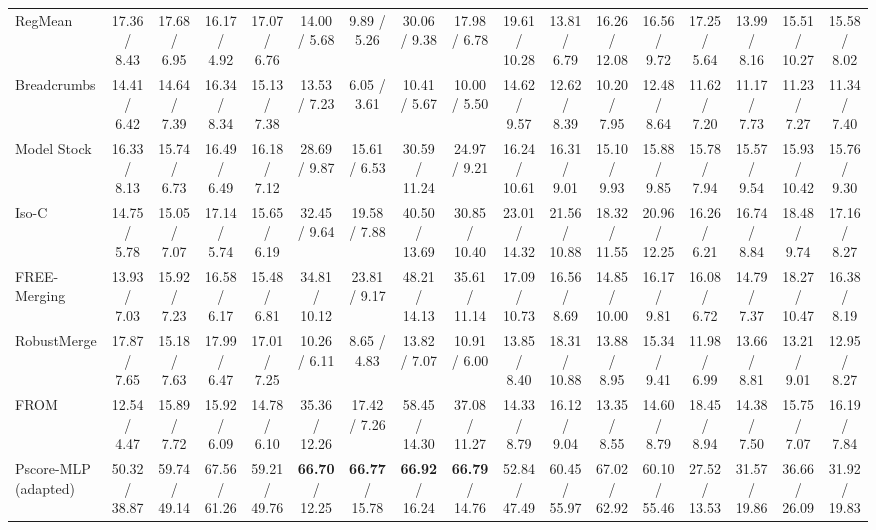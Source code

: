 \documentclass[journal,twoside,web]{ieeecolor}
\newcommand{\pub}[1]{{\color{gray}{\footnotesize{[{#1}]}}}}
\begin{document}
\begin{table}[!t]
{\begin{tabular}{l||ccc:c|ccc:c|ccc:c|ccc:c}
RegMean\pub{ICLR 2023} & 17.36 / 8.43 & 17.68 / 6.95 & 16.17 / 4.92 & 17.07 / 6.76 & 14.00 / 5.68 & 9.89 / 5.26 & 30.06 / 9.38 & 17.98 / 6.78 & 19.61 / 10.28 & 13.81 / 6.79 & 16.26 / 12.08 & 16.56 / 9.72 & 17.25 / 5.64 & 13.99 / 8.16 & 15.51 / 10.27 & 15.58 / 8.02 \\

Breadcrumbs\pub{ECCV 2024} & 14.41 / 6.42 & 14.64 / 7.39 & 16.34 / 8.34 & 15.13 / 7.38 & 13.53 / 7.23 & 6.05 / 3.61 & 10.41 / 5.67 & 10.00 / 5.50 & 14.62 / 9.57 & 12.62 / 8.39 & 10.20 / 7.95 & 12.48 / 8.64 & 11.62 / 7.20 & 11.17 / 7.73 & 11.23 / 7.27 & 11.34 / 7.40 \\


Model Stock\pub{ECCV 2024} & 16.33 / 8.13 & 15.74 / 6.73 & 16.49 / 6.49 & 16.18 / 7.12 & 28.69 / 9.87 & 15.61 / 6.53 & 30.59 / 11.24 & 24.97 / 9.21 & 16.24 / 10.61 & 16.31 / 9.01 & 15.10 / 9.93 & 15.88 / 9.85 & 15.78 / 7.94 & 15.57 / 9.54 & 15.93 / 10.42 & 15.76 / 9.30 \\

Iso-C\pub{ICML 2025} & 14.75 / 5.78 & 15.05 / 7.07 & 17.14 / 5.74 & 15.65 / 6.19 & 32.45 / 9.64 & 19.58 / 7.88 & 40.50 / 13.69 & 30.85 / 10.40 & 23.01 / 14.32 & 21.56 / 10.88 & 18.32 / 11.55 & 20.96 / 12.25 & 16.26 / 6.21 & 16.74 / 8.84 & 18.48 / 9.74 & 17.16 / 8.27 \\

FREE-Merging\pub{ICCV 2025} & 13.93 / 7.03 & 15.92 / 7.23 & 16.58 / 6.17 & 15.48 / 6.81 & 34.81 / 10.12 & 23.81 / 9.17 & 48.21 / 14.13 & 35.61 / 11.14 & 17.09 / 10.73 & 16.56 / 8.69 & 14.85 / 10.00 & 16.17 / 9.81 & 16.08 / 6.72 & 14.79 / 7.37 & 18.27 / 10.47 & 16.38 / 8.19 \\

RobustMerge\pub{NeurIPS 2025} & 17.87 / 7.65 & 15.18 / 7.63 & 17.99 / 6.47 & 17.01 / 7.25 & 10.26 / 6.11 & 8.65 / 4.83 & 13.82 / 7.07 & 10.91 / 6.00 & 13.85 / 8.40 & 18.31 / 10.88 & 13.88 / 8.95 & 15.34 / 9.41 & 11.98 / 6.99 & 13.66 / 8.81 & 13.21 / 9.01 & 12.95 / 8.27 \\


FROM\pub{AAAI 2026} & 12.54 / 4.47 & 15.89 / 7.72 & 15.92 / 6.09 & 14.78 / 6.10 & 35.36 / 12.26 & 17.42 / 7.26 & 58.45 / 14.30 & 37.08 / 11.27 & 14.33 / 8.79 & 16.12 / 9.04 & 13.35 / 8.55 & 14.60 / 8.79 & 18.45 / 8.94 & 14.38 / 7.50 & 15.75 / 7.07 & 16.19 / 7.84 \\

\hdashline
Pscore-MLP (adapted)\pub{TMI 2022} & 50.32 / 38.87 & 59.74 / 49.14 & 67.56 / 61.26 & 59.21 / 49.76 & \textbf{66.70} / 12.25 & \textbf{66.77} / 15.78 & \textbf{66.92} / 16.24 & \textbf{66.79} / 14.76 & 52.84 / 47.49 & 60.45 / 55.97 & 67.02 / 62.92 & 60.10 / 55.46 & 27.52 / 13.53 & 31.57 / 19.86 & 36.66 / 26.09 & 31.92 / 19.83 \\


\end{tabular}}
\end{table}
\end{document}
